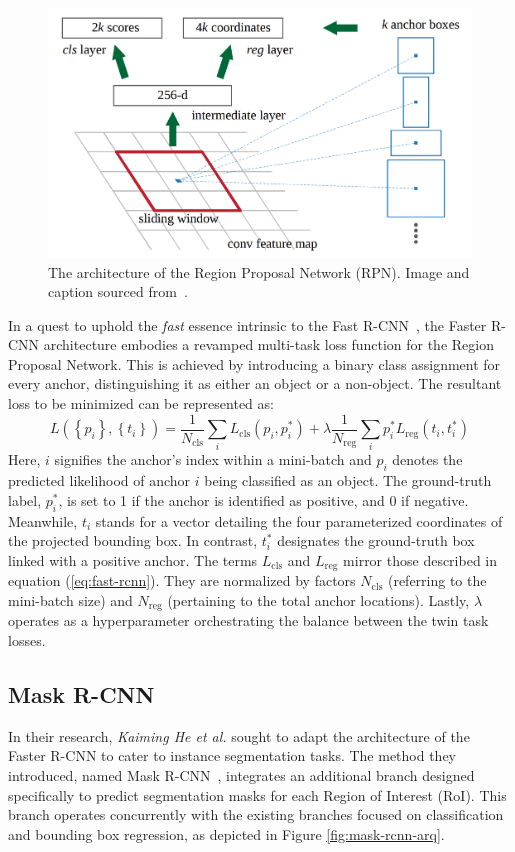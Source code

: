 \begin{figure}[htb]
    \centering
    \includegraphics[width=0.7\linewidth]{figures/chapters-imgs/30/faster-rcnn-anchors.png}
    \caption{The architecture of the Region Proposal Network (RPN). Image and caption sourced from~\cite{DBLP:journals/corr/RenHG015}.}
    \label{fig:faster-rcnn-anchors}
\end{figure}

In a quest to uphold the \textit{fast} essence intrinsic to the Fast R-CNN~\cite{DBLP:journals/corr/Girshick15}, the Faster R-CNN architecture embodies a revamped multi-task loss function for the Region Proposal Network. This is achieved by introducing a binary class assignment for every anchor, distinguishing it as either an object or a non-object. The resultant loss to be minimized can be represented as:
\begin{equation}
L\left(\left\{p_i\right\},\left\{t_i\right\}\right)=\frac{1}{N_\mathrm{cls}} \sum_i L_\mathrm{cls}\left(p_i, p_i^*\right) +\lambda \frac{1}{N_{\mathrm {reg}}} \sum_i p_i^* L_{\mathrm{reg}}\left(t_i, t_i^*\right) \label{eq:faster-rcnn}
\end{equation}
Here, $i$ signifies the anchor's index within a mini-batch and $p_i$ denotes the predicted likelihood of anchor $i$ being classified as an object. The ground-truth label, $p_i^*$, is set to 1 if the anchor is identified as positive, and 0 if negative. Meanwhile, $t_i$ stands for a vector detailing the four parameterized coordinates of the projected bounding box. In contrast, $t_i^*$ designates the ground-truth box linked with a positive anchor. The terms $L_{\mathrm{cls}}$ and $L_{\mathrm{reg}}$ mirror those described in equation (\ref{eq:fast-rcnn}). They are normalized by factors $N_\mathrm{cls}$ (referring to the mini-batch size) and $N_\mathrm{reg}$ (pertaining to the total anchor locations). Lastly, \(\lambda\) operates as a hyperparameter orchestrating the balance between the twin task losses.

\subsection{Mask R-CNN}
In their research, \textit{Kaiming He et al.} sought to adapt the architecture of the Faster R-CNN to cater to instance segmentation tasks. The method they introduced, named Mask R-CNN~\cite{DBLP:journals/corr/HeGDG17}, integrates an additional branch designed specifically to predict segmentation masks for each Region of Interest (RoI). This branch operates concurrently with the existing branches focused on classification and bounding box regression, as depicted in Figure \ref{fig:mask-rcnn-arq}.\\

